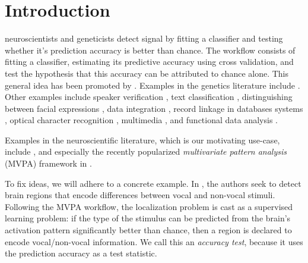 \documentclass[onecolumn,draftclsnofoot]{IEEEtran}
\begin{document}
\section{Introduction}
\label{sec:introduction}

 neuroscientists and geneticists detect signal by fitting a classifier and testing whether it's prediction accuracy is better than chance. 
The workflow consists of fitting a classifier, estimating its predictive accuracy using cross validation, and test the hypothesis that this accuracy can be attributed to chance alone. 
This general idea has been promoted by \cite{friedman2003multivariate,eric2008testing,ojala_permutation_2010,lopez2016revisiting}.
Examples in the genetics literature include
\cite{golub_molecular_1999,slonim_class_2000,radmacher_paradigm_2002,mukherjee_estimating_2003,juan_prediction_2004,jiang_calculating_2008,yu2007two}.
Other examples include speaker verification \cite{gretton_kernel_2012-1}, 
text classification \cite{dhillon2003divisive,lopez2016revisiting}, distinguishing between facial expressions \cite{lopez2016revisiting}, data integration \cite{gretton_kernel_2012-1}, record linkage in databases systems \cite{gretton_kernel_2012-1,hall2002permutation,vayatis_auc_2009}, optical character recognition \cite{perez2009estimation}, multimedia \cite{moreno2004kullback}, and functional data analysis \cite{hall2002permutation}.

Examples in the neuroscientific literature, which is our motivating use-case, include \cite{golland_permutation_2003,pereira_machine_2009,schreiber2013statistical,olivetti2013kernel,varoquaux_assessing_2016}, and especially the recently popularized \emph{multivariate pattern analysis} (MVPA) framework in \cite{kriegeskorte_information-based_2006}.

To fix ideas, we will adhere to a concrete example.
In \cite{gilron_quantifying_2016}, the authors seek to detect brain regions that encode differences between vocal and non-vocal stimuli. 
Following the MVPA workflow, the localization problem is cast as a supervised learning problem: if the type of the stimulus can be predicted from the brain's activation pattern significantly better than chance, then a region is declared to encode vocal/non-vocal information. 
We call this an \emph{accuracy test}, because it uses the prediction accuracy as a test statistic. 
\end{document}
